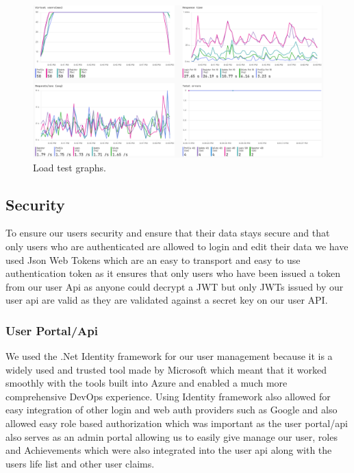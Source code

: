 \documentclass[a4paper]{article}
\begin{document}
\newpage

\begin{figure}[h]
  \includegraphics[width=\linewidth]{../Assets/load_test_graph.png}
  \caption{Load test graphs.}
  \label{fig:load graphs}
\end{figure}

\subsection{Security}
To ensure our users security and ensure that their data stays secure and that 
only users who are authenticated are allowed to login and edit their data we 
have used Json Web Tokens which are an easy to transport and easy to use authentication
token as it ensures that only users who have been issued a token from our user Api
as anyone could decrypt a JWT but only JWTs issued by our user api are valid as they 
are validated against a secret key on our user API.

\subsubsection{User Portal/Api}

We used the .Net Identity framework for our user management because it is a widely 
used and trusted tool made by Microsoft which meant that it worked smoothly with 
the tools built into Azure and enabled a much more comprehensive DevOps experience.
\newline
Using Identity framework also allowed for easy integration of other login and web auth 
providers such as Google and also allowed easy role based authorization which was important 
as the user portal/api also serves as an admin portal allowing us to easily give manage 
our user, roles and Achievements which were also integrated into the user api along with 
the users life list and other user claims.
\end{document}
